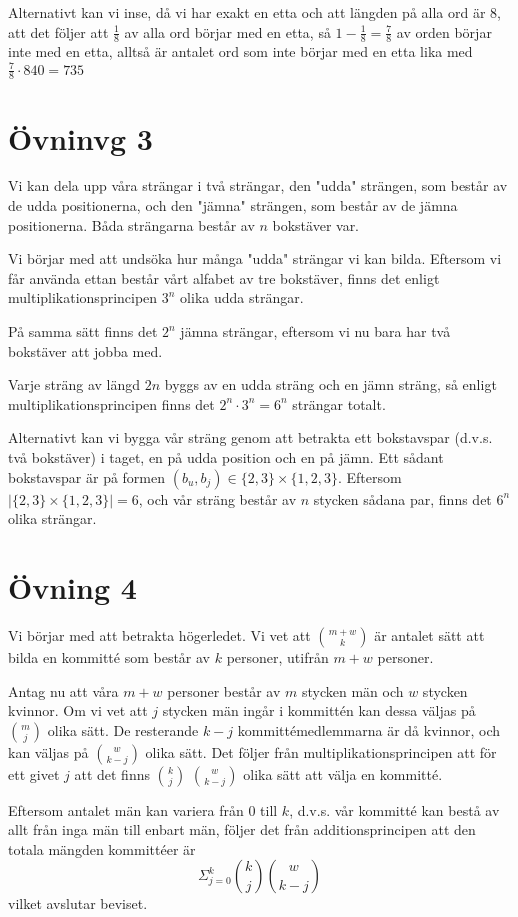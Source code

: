 \documentclass{article}
\begin{document}
Alternativt kan vi inse, då vi har exakt en etta och att längden på alla ord är 8, att det följer att $\frac{1}{8}$ av alla ord börjar med en etta, så $1-\frac{1}{8}=\frac{7}{8}$ av orden börjar inte med en etta, alltså är antalet ord som inte börjar med en etta lika med $\frac{7}{8}\cdot 840=735$

\section*{Övninvg 3}
Vi kan dela upp våra strängar i två strängar, den "udda" strängen, som består av de udda positionerna, och den "jämna" strängen, som består av de jämna positionerna. Båda strängarna består av $n$ bokstäver var. 

Vi börjar med att undsöka hur många "udda" strängar vi kan bilda. Eftersom vi får använda ettan består vårt alfabet av tre bokstäver,  finns det enligt multiplikationsprincipen $3^n$ olika udda strängar. 

På samma sätt finns det $2^n$ jämna strängar, eftersom vi nu bara har två bokstäver att jobba med. 

Varje sträng av längd $2n$ byggs av en udda sträng och en jämn sträng, så enligt multiplikationsprincipen finns det $2^n\cdot 3^n=6^n$ strängar totalt. 


Alternativt kan vi bygga vår sträng genom att betrakta ett bokstavspar (d.v.s. två bokstäver) i taget, en på udda position och en på jämn. Ett sådant bokstavspar är på formen $(b_u, b_j)\in \{2, 3\}\times \{1, 2, 3\}$. Eftersom $|\{2, 3\}\times \{1, 2, 3\}|=6$, och vår sträng består av $n$ stycken sådana par, finns det $6^n$ olika strängar. 

\section*{Övning 4}
Vi börjar med att betrakta högerledet. Vi vet att $m + w \choose k$ är antalet sätt att bilda en kommitté som består av $k$ personer, utifrån $m + w$ personer. 


Antag nu att våra $m + w$ personer består av $m$ stycken män och $w$ stycken kvinnor. Om vi vet att $j$ stycken män ingår i kommittén kan dessa väljas på $m \choose j$ olika sätt. De resterande $k - j$ kommittémedlemmarna är då kvinnor, och kan väljas på $w \choose k - j$ olika sätt. Det följer från multiplikationsprincipen att för ett givet $j$ att det finns $k \choose j$ $w \choose k - j$ olika sätt att välja en kommitté. 

Eftersom antalet män kan variera från $0$ till $k$, d.v.s. vår kommitté kan bestå av allt från inga män till enbart män, följer det från additionsprincipen att den totala mängden kommittéer är $$
\Sigma _{j=0} ^{k} {k \choose j} {w \choose k - j}
$$
vilket avslutar beviset. 
\end{document}
